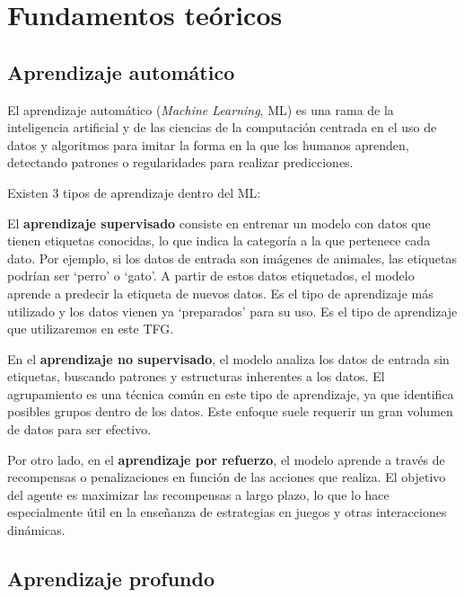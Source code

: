 \chapter{Fundamentos teóricos}
\thispagestyle{empty}

\section{Aprendizaje automático}
El aprendizaje automático (\textit{Machine Learning}, ML) \cite{22,23} es una rama de la inteligencia artificial y de las ciencias de la computación centrada en el uso de datos y algoritmos para imitar la forma en la que los humanos aprenden, detectando patrones o regularidades para realizar predicciones.

Existen 3 tipos de aprendizaje dentro del ML:

El \textbf{aprendizaje supervisado} consiste en entrenar un modelo con datos que tienen etiquetas conocidas, lo que indica la categoría a la que pertenece cada dato. Por ejemplo, si los datos de entrada son imágenes de animales, las etiquetas podrían ser \enquote*{perro} o \enquote*{gato}. A partir de estos datos etiquetados, el modelo aprende a predecir la etiqueta de nuevos datos. Es el tipo de aprendizaje más utilizado y los datos vienen ya \enquote*{preparados} para su uso. Es el tipo de aprendizaje que utilizaremos en este TFG.

En el \textbf{aprendizaje no supervisado}, el modelo analiza los datos de entrada sin etiquetas, buscando patrones y estructuras inherentes a los datos. El agrupamiento es una técnica común en este tipo de aprendizaje, ya que identifica posibles grupos dentro de los datos. Este enfoque suele requerir un gran volumen de datos para ser efectivo.

Por otro lado, en el \textbf{aprendizaje por refuerzo}, el modelo aprende a través de recompensas o penalizaciones en función de las acciones que realiza. El objetivo del agente es maximizar las recompensas a largo plazo, lo que lo hace especialmente útil en la enseñanza de estrategias en juegos y otras interacciones dinámicas.

\section{Aprendizaje profundo}

